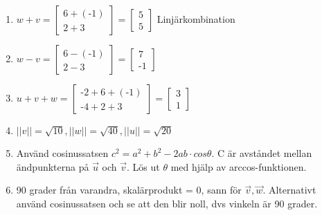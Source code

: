 \begin{enumerate}
\item $w+v = \begin{bmatrix}6+(\text{-}1)\\ 2+3\end{bmatrix} =\begin{bmatrix} 5\\ 5 \end{bmatrix}$ Linjärkombination
\item $w-v = \begin{bmatrix}6-(\text{-}1)\\ 2-3\end{bmatrix} = \begin{bmatrix} 7\\ \text{-}1\end{bmatrix}$
\item $u+v+w= \begin{bmatrix}\text{-}2+6+(\text{-}1)\\ \text{-}4+2+3\end{bmatrix} = \begin{bmatrix}3\\ 1\end{bmatrix}$
\item $||v||=\sqrt{10}, ||w||=\sqrt{40}, ||u||=\sqrt{20}$
\item Använd cosinussatsen $c^2=a^2+b^2-2ab\cdot cos \theta$. C är avståndet mellan ändpunkterna på $\vec{u}$ och $\vec{v}$. Lös ut $\theta$ med hjälp av arccos-funktionen. 
\item 90 grader från varandra, skalärprodukt = 0, sann för $\vec{v}, \vec{w}$. Alternativt använd cosinussatsen och se att den blir noll, dvs vinkeln är 90 grader. 
\end{enumerate}